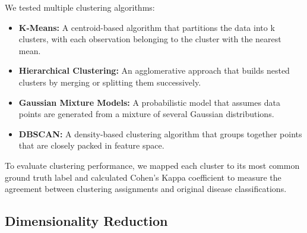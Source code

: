\documentclass[12pt,a4paper,oneside]{report}
\begin{document}
We tested multiple clustering algorithms:
\begin{itemize}
    \item \textbf{K-Means:} A centroid-based algorithm that partitions the data into k clusters, with each observation belonging to the cluster with the nearest mean.
    
    \item \textbf{Hierarchical Clustering:} An agglomerative approach that builds nested clusters by merging or splitting them successively.
    
    \item \textbf{Gaussian Mixture Models:} A probabilistic model that assumes data points are generated from a mixture of several Gaussian distributions.
    
    \item \textbf{DBSCAN:} A density-based clustering algorithm that groups together points that are closely packed in feature space.
\end{itemize}

To evaluate clustering performance, we mapped each cluster to its most common ground truth label and calculated Cohen's Kappa coefficient to measure the agreement between clustering assignments and original disease classifications.

\subsection{Dimensionality Reduction}
\end{document}

